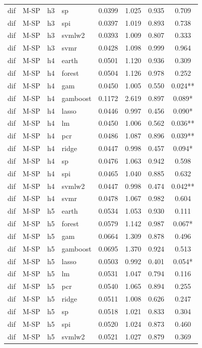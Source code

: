 \begin{ThreePartTable}
\begin{longtable}[t]{llclcccc}
dif & M-SP & h3 & sp & 0.0399 & 1.025 & 0.935 & 0.709\\
dif & M-SP & h3 & spi & 0.0397 & 1.019 & 0.893 & 0.738\\
dif & M-SP & h3 & svmlw2 & 0.0393 & 1.009 & 0.807 & 0.333\\
dif & M-SP & h3 & svmr & 0.0428 & 1.098 & 0.999 & 0.964\\
\addlinespace
dif & M-SP & h4 & earth & 0.0501 & 1.120 & 0.936 & 0.309\\
dif & M-SP & h4 & forest & 0.0504 & 1.126 & 0.978 & 0.252\\
dif & M-SP & h4 & gam & 0.0450 & 1.005 & 0.550 & 0.024**\\
dif & M-SP & h4 & gamboost & 0.1172 & 2.619 & 0.897 & 0.089*\\
dif & M-SP & h4 & lasso & 0.0446 & 0.997 & 0.456 & 0.090*\\
dif & M-SP & h4 & lm & 0.0450 & 1.006 & 0.562 & 0.036**\\
dif & M-SP & h4 & pcr & 0.0486 & 1.087 & 0.896 & 0.039**\\
dif & M-SP & h4 & ridge & 0.0447 & 0.998 & 0.457 & 0.094*\\
dif & M-SP & h4 & sp & 0.0476 & 1.063 & 0.942 & 0.598\\
dif & M-SP & h4 & spi & 0.0465 & 1.040 & 0.885 & 0.632\\
dif & M-SP & h4 & svmlw2 & 0.0447 & 0.998 & 0.474 & 0.042**\\
dif & M-SP & h4 & svmr & 0.0478 & 1.067 & 0.982 & 0.604\\
\addlinespace
dif & M-SP & h5 & earth & 0.0534 & 1.053 & 0.930 & 0.111\\
dif & M-SP & h5 & forest & 0.0579 & 1.142 & 0.987 & 0.067*\\
dif & M-SP & h5 & gam & 0.0664 & 1.309 & 0.878 & 0.496\\
dif & M-SP & h5 & gamboost & 0.0695 & 1.370 & 0.924 & 0.513\\
dif & M-SP & h5 & lasso & 0.0503 & 0.992 & 0.401 & 0.054*\\
dif & M-SP & h5 & lm & 0.0531 & 1.047 & 0.794 & 0.116\\
dif & M-SP & h5 & pcr & 0.0540 & 1.065 & 0.894 & 0.255\\
dif & M-SP & h5 & ridge & 0.0511 & 1.008 & 0.626 & 0.247\\
dif & M-SP & h5 & sp & 0.0518 & 1.021 & 0.833 & 0.304\\
dif & M-SP & h5 & spi & 0.0520 & 1.024 & 0.873 & 0.460\\
dif & M-SP & h5 & svmlw2 & 0.0521 & 1.027 & 0.879 & 0.369\\

\end{longtable}
\end{ThreePartTable}
